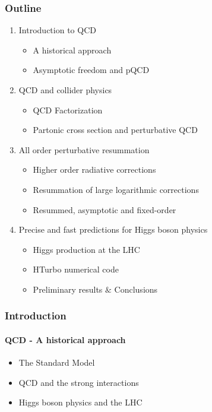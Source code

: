 \documentclass[aspectratio=43]{beamer}
\begin{document}
\begin{frame}

	\frametitle{Outline}
	
	\begin{enumerate}
		\item {\color{blue}Introduction to QCD}
		\begin{itemize}
			\item A historical approach
			\item Asymptotic freedom and pQCD
		\end{itemize}
		\item {\color{blue}QCD and collider physics}
		\begin{itemize}
			\item QCD Factorization
			\item Partonic cross section and perturbative QCD
		\end{itemize}
		\item {\color{blue}All order perturbative resummation}
		\begin{itemize}
			\item Higher order radiative corrections
			\item Resummation of large logarithmic corrections
			\item Resummed, asymptotic and fixed-order
		\end{itemize}
		\item {\color{blue}Precise and fast predictions for Higgs boson physics}
		\begin{itemize}
			\item Higgs production at the LHC
			\item HTurbo numerical code
			\item Preliminary results $\&$ Conclusions
		\end{itemize}
	\end{enumerate}
	
\end{frame}

%
%

\begin{frame}


\end{frame}

\begin{frame}

	\frametitle{Introduction}
	\framesubtitle{QCD - A historical approach}
	
	\begin{itemize}
		\item \footnotesize The Standard Model
		\item \footnotesize QCD and the strong interactions
		\item \footnotesize Higgs boson physics and the LHC
	\end{itemize}


\end{frame}
\end{document}

